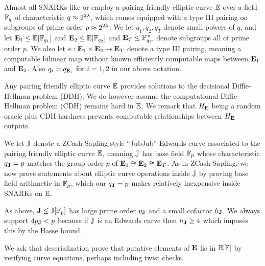 \smallskip

Almost all SNARKs like \cite{Groth16} or \cite{plonk} employ a pairing friendly elliptic curve ${\mathbb{E}}$ over a field $\mathbb{F}_q$ of characteristic $q \approx 2^{2\lambda}$, which comes equipped with a type III pairing on subgroups of prime order $p \approx 2^{2\lambda}$:  We let $q_1,q_2,q_T$ denote small powers of $q$, and let ${\mathbf{E}}_1 \le {\mathbb{E}}[\mathbb{F}_{q_1}]$ and ${\mathbf{E}}_2 \le {\mathbb{E}}[\mathbb{F}_{q_2}]$ and ${\mathbf{E}}_T \le \mathbb{F}_{q_T}^\times$ denote subgroups all of prime order $p$.  We also let $e : {\mathbf{E}}_1 \times {\mathbf{E}}_2 \to {\mathbf{E}}_T$ denote a type III pairing, meaning a computable bilinear map without known efficiently computable maps between ${\mathbf{E}}_1$ and ${\mathbf{E}}_2$.  Also $q_i = q_{{\mathbf{E}}_i}$ for $i=1,2$ in our above notation.  

Any pairing friendly elliptic curve ${\mathbb{E}}$ provides solutions to the decisional Diffie-Hellman problem (DDH).  We do however assume the computational Diffie-Hellman problem (CDH) remains hard in ${\mathbb{E}}$.  We remark that $H_{\mathbf{E}}$ being a random oracle plus CDH hardness prevents computable relationships between $H_{\mathbf{E}}$ outputs.


\smallskip


We let ${\mathbb{J}}$ denote a ZCash Sapling style ``JubJub'' Edwards curve associated to the pairing friendly elliptic curve ${\mathbb{E}}$, meaning ${\mathbb{J}}$ has base field $\mathbb{F}_p$ whose characteristic $q_{{\mathbf{J}}} = p$ matches the group order $p$ of ${\mathbf{E}}_1 \cong {\mathbf{E}}_2 \cong {\mathbf{E}}_T$.  As in ZCash Sapling, we now prove statements about elliptic curve operations inside ${\mathbb{J}}$ by proving base field arithmetic in $\mathbb{F}_p$, which our $q_{{\mathbf{J}}} = p$ makes relatively inexpensive inside SNARKs on ${\mathbb{E}}$.

As above, ${\mathbf{J}} \le {\mathbb{J}}[\mathbb{F}_p]$ has large prime order $p_{{\mathbf{J}}}$ and a small cofactor $h_{{\mathbf{J}}}$.  We always support $4 p_{{\mathbf{J}}} < p$ because if ${\mathbb{J}}$ is an Edwards curve then $h_{{\mathbf{J}}} \ge 4$ which imposes this by the Hasse bound.

\smallskip

We ask that deserialization prove that putative elements of ${\mathbf{E}}$ lie in
${\mathbb{E}}[\mathbb{F}]$ by verifying curve equations, perhaps including twist checks.

